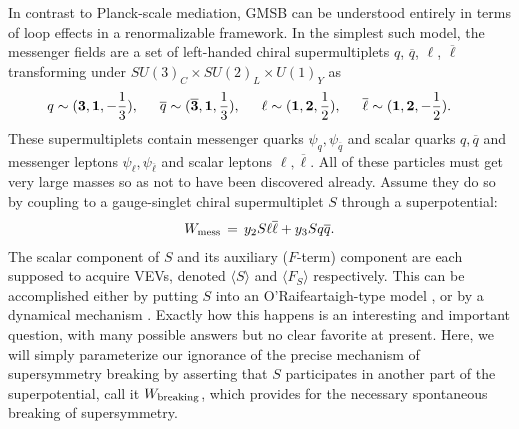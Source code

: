 \documentclass[11pt]{article}
\def\beq{\begin{eqnarray}}
\def\eeq{\end{eqnarray}}
\begin{document}
In contrast to Planck-scale mediation, GMSB can be understood entirely in 
terms of loop effects in a renormalizable framework. In the simplest 
such model, the messenger fields are a set of left-handed chiral 
supermultiplets $q$, $\overline q$, $\ell$, $\overline \ell$
transforming under $SU(3)_C\times SU(2)_L\times U(1)_Y$ as
\beq
q\sim({\bf 3},{\bf 1}, -{1\over 3}),\qquad\!\!\!
\overline q\sim({\bf \overline 3},{\bf 1}, {1\over 3}),\qquad\!\!\!
\ell \sim({\bf 1},{\bf 2}, {1\over 2}),\qquad\!\!\!
\overline \ell\sim({\bf 1},{\bf 2}, -{1\over 2}).\qquad\!\!\!{}
\label{minimalmess}
\eeq
These supermultiplets contain messenger quarks $\psi_q, \psi_{\overline
q}$ and scalar quarks $q, \overline q$ and messenger leptons $\psi_\ell,
\psi_{\overline \ell}$ and scalar leptons $\ell, \overline \ell$. All of
these particles must get very large masses so as not to have been
discovered already. Assume they do so by coupling to a gauge-singlet
chiral supermultiplet $S$ through a superpotential: 
\beq
W_{\rm mess} \, = \, y_2 S \ell \overline \ell + y_3 S q \overline q .
\eeq
The scalar component of $S$ and its auxiliary ($F$-term) component are 
each supposed to acquire VEVs, denoted $\langle S \rangle $ and $\langle 
F_S \rangle $ respectively. This can be accomplished either by putting $S$ 
into an O'Rai\-f\-ear\-taigh-type model \cite{oldgmsb}, or by a dynamical 
mechanism \cite{newgmsb}. Exactly how this happens is an interesting and 
important question, with many possible answers but no clear 
favorite at present.  Here, we will 
simply parameterize our ignorance of the precise mechanism of 
supersymmetry breaking by asserting that $S$ participates in another part 
of the superpotential, call it $W_{\rm breaking}$, which provides for the 
necessary spontaneous breaking of supersymmetry.
\end{document}
